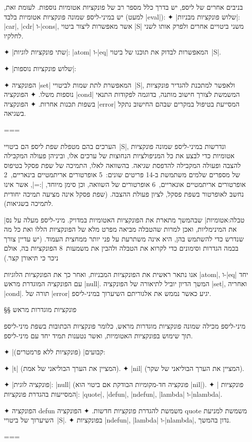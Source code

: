 בניבים אחרים של ליספ, יש בדרך כלל מספר רב של פונקציות אטומיות נוספות. לעומת
זאת, יש במיני-ליספ שמונה פונקציות אטומיות בלבד (למעט \E|eval|):
✦ \ע|שלוש פונקציות מבניות|: \E|car|, \E|cdr| ו-\E|cons|, אשר מאפשרות ליצור
ביטוי \E|S| משני ביטויים אחרים ולפרק אותו לשני לחלקיו.

✦ \ע|שתי פונקציות לוגיות|: \E|atom| ו-\E|eq| המאפשרות לבדוק את תוכנו של
ביטוי~\E|S|.

✦ \ע|שלוש פונקציות נוספות|:
\begin{itemize}
    ✦ הפונקציה \E|set| המאפשרת לתת שמות לביטויי~\E|S|, ולאפשר למתכנת להגדיר
      פונקציות נוספות משלו.
      ✦ הפונקציה \E|cond| המשמשת לצורך חישוב מותנה, בדוגמה לפקודות התנאי בשפות תכנות אחרות.
      ✦ הפונקציה \E|error| המסייעת בטיפול במקרים שבהם החישוב נתקל בשגיאה.
\end{itemize}
===

הערכים בהם מטפלת שפת ליספ הם ביטויי~\E|S|, ונדרשות במיני-ליספ שמונה פונקציות
אטומיות כדי לבצע את כל המניפולציות הנחוצות של ערכים אלו, וביניהן פעולה המקבילה
להצבה ופעולה המקבילה להדפסת שגיאה. בהשוואה לאלו, התמיכה של שפת פסקל בטיפוס של
מספרים שלמים משתמשת ב-14 פריטים שונים:~5 אופרטורים אריתמטיים בינאריים,~2
אופרטורים אריתמטיים אונאריים,~6 אופרטורים של השוואה, וכן סימן מיוחד, \E|:=|,
אשר אינו נחשב לאופרטור בשפת פסקל, לציון פעולת ההצבה. (שפת פסקל אינה מציעה תמיכה
יחודית לתמיכה בשגיאות).

|טבלה:אטומיות| שבהמשך מתארת את הפונקציות האטומיות במדויק. מיני-ליספ מעלה
על נס את המינימליות, ואכן למרות שהטבלה מביאה מפרט מלא של הפונקציות הללו ואת כל
מה שנדרש כדי להשתמש בהן, היא אינה משתרעת על פני יותר ממחצית העמוד. (יש עדיין
צורך בכמה הגדרות וסימונים כדי לקרוא את הטבלה ולהבין את משמעות~8 הפונקציות בה,
אולם ניכר כי תיאורן קצר.)

אנו נתאר ראשית את הפונקציות המבניות, ואחר כך את הפונקציות הלוגיות \E|atom|,
ו-\E|eq| יחד עם הפונקציה המוגדרת מראש \E|null|. המשך הדיון יוביל לתיאורה של
הפונקציה \E|set|, ואחריה \E|cond|. תורה של \E|error| יגיע כאשר נממש את
אלגוריתם השיערוך במיני-ליספ.

§§ פונקציות מוגדרות מראש

מיני-ליספ מכילה שמונה פונקציות מוגדרות מראש, כלומר פונקציות הכתובות בשפת
מיני-ליספ תוך שימוש בפונקציות האטומיות, ואשר נטענות תמיד יחד עם מיני-ליספ.

✦ \ע|קבועים| (פונקציות ללא פרמטרים):
\begin{itemize}
  ✦ \E|t| (המציין את הערך הבוליאני של אמת).
  ✦ \E|nil| (המציין את הערך הבוליאני של שקר).
\end{itemize}
✦ \ע|פונקציה לוגית|: \E|null| (פונקציה חד-מקומיות הבודקת אם ביטוי הוא \E|nil|).
✦ \ע| פונקציות המסייעות בהגדרת פונקציות|:
\E|quote|, \E|defun|, \E|ndefun|, \E|lambda| ו-\E|nlambda|.
\begin{itemize}
  ✦ הפונקציה defun משמשת להגדרת פונקציות חדשות.
  ✦ הפונקציה quote משמשת למניעת השיערוך של ביטויי~\E|S|.
  ✦ בפונקציות \E|ndefun|, \E|lambda| ו-\E|nlambda|, נדון בהמשך.
\end{itemize}
===

